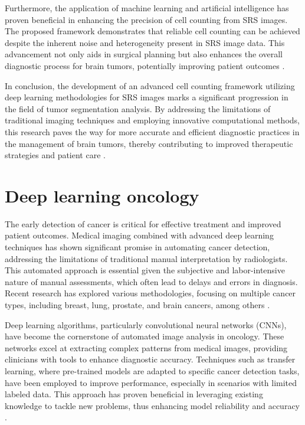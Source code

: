\documentclass[runningheads]{llncs}
\begin{document}
Furthermore, the application of machine learning and artificial intelligence has proven beneficial in enhancing the precision of cell counting from SRS images. The proposed framework demonstrates that reliable cell counting can be achieved despite the inherent noise and heterogeneity present in SRS image data. This advancement not only aids in surgical planning but also enhances the overall diagnostic process for brain tumors, potentially improving patient outcomes \cite{Qianqian_2021}.

In conclusion, the development of an advanced cell counting framework utilizing deep learning methodologies for SRS images marks a significant progression in the field of tumor segmentation analysis. By addressing the limitations of traditional imaging techniques and employing innovative computational methods, this research paves the way for more accurate and efficient diagnostic practices in the management of brain tumors, thereby contributing to improved therapeutic strategies and patient care \cite{Qianqian_2021}.
\section{Deep learning oncology}
The early detection of cancer is critical for effective treatment and improved patient outcomes. Medical imaging combined with advanced deep learning techniques has shown significant promise in automating cancer detection, addressing the limitations of traditional manual interpretation by radiologists. This automated approach is essential given the subjective and labor-intensive nature of manual assessments, which often lead to delays and errors in diagnosis. Recent research has explored various methodologies, focusing on multiple cancer types, including breast, lung, prostate, and brain cancers, among others \cite{Istiak_2024}.

Deep learning algorithms, particularly convolutional neural networks (CNNs), have become the cornerstone of automated image analysis in oncology. These networks excel at extracting complex patterns from medical images, providing clinicians with tools to enhance diagnostic accuracy. Techniques such as transfer learning, where pre-trained models are adapted to specific cancer detection tasks, have been employed to improve performance, especially in scenarios with limited labeled data. This approach has proven beneficial in leveraging existing knowledge to tackle new problems, thus enhancing model reliability and accuracy \cite{Longfeng_2023}.
\end{document}
